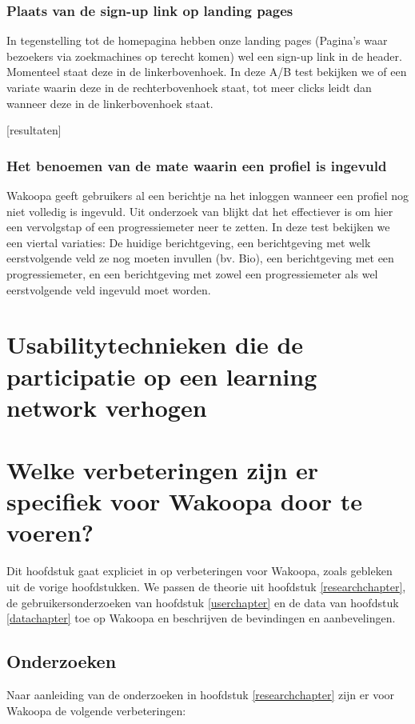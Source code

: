 \documentclass[a4paper, 10pt, pdftex]{report}
\begin{document}
    \subsection{Plaats van de sign-up link op landing pages}
      \label{ctatest}
      In tegenstelling tot de homepagina hebben onze landing pages (Pagina's waar bezoekers via zoekmachines op terecht komen) wel een sign-up link in de header. Momenteel staat deze in de linkerbovenhoek. In deze A/B test bekijken we of een variate waarin deze in de rechterbovenhoek staat, tot meer clicks leidt dan wanneer deze in de linkerbovenhoek staat.

      [resultaten]

    \subsection{Het benoemen van de mate waarin een profiel is ingevuld}
      \label{profileprogress}
      Wakoopa geeft gebruikers al een berichtje na het inloggen wanneer een profiel nog niet volledig is ingevuld. Uit onderzoek van \cite{Brouns2008} blijkt dat het effectiever is om hier een vervolgstap of een progressiemeter neer te zetten. In deze test bekijken we een viertal variaties: De huidige berichtgeving, een berichtgeving met welk eerstvolgende veld ze nog moeten invullen (bv. Bio), een berichtgeving met een progressiemeter, en een berichtgeving met zowel een progressiemeter als wel eerstvolgende veld ingevuld moet worden.

  \newpage
  \chapter{Usabilitytechnieken die de participatie op een learning network verhogen}


  \newpage
  \chapter{Welke verbeteringen zijn er specifiek voor Wakoopa door te voeren?}
    \newpage

    Dit hoofdstuk gaat expliciet in op verbeteringen voor Wakoopa, zoals gebleken uit de vorige hoofdstukken. We passen de theorie uit hoofdstuk \ref{researchchapter}, de gebruikersonderzoeken van hoofdstuk \ref{userchapter} en de data van hoofdstuk \ref{datachapter} toe op Wakoopa en beschrijven de bevindingen en aanbevelingen.

    \section{Onderzoeken}
    Naar aanleiding van de onderzoeken in hoofdstuk \ref{researchchapter} zijn er voor Wakoopa de volgende verbeteringen:
\end{document}
